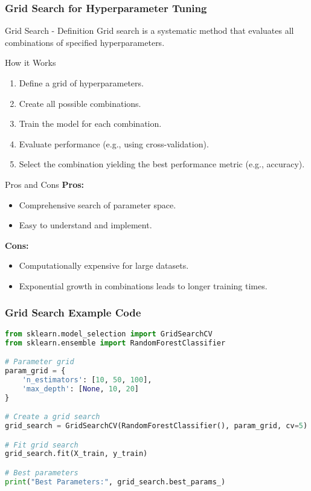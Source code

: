 \documentclass[aspectratio=169]{beamer}
\begin{document}
\begin{frame}[fragile]
    \frametitle{Grid Search for Hyperparameter Tuning}
    \begin{block}{Grid Search - Definition}
        Grid search is a systematic method that evaluates all combinations of specified hyperparameters.
    \end{block}
    
    \begin{block}{How it Works}
        \begin{enumerate}
            \item Define a grid of hyperparameters.
            \item Create all possible combinations.
            \item Train the model for each combination.
            \item Evaluate performance (e.g., using cross-validation).
            \item Select the combination yielding the best performance metric (e.g., accuracy).
        \end{enumerate}
    \end{block}
    
    \begin{block}{Pros and Cons}
        \textbf{Pros:}
        \begin{itemize}
            \item Comprehensive search of parameter space.
            \item Easy to understand and implement.
        \end{itemize}
        \textbf{Cons:}
        \begin{itemize}
            \item Computationally expensive for large datasets.
            \item Exponential growth in combinations leads to longer training times.
        \end{itemize}
    \end{block}
\end{frame}

\begin{frame}[fragile]
    \frametitle{Grid Search Example Code}
    \begin{lstlisting}[language=Python]
from sklearn.model_selection import GridSearchCV
from sklearn.ensemble import RandomForestClassifier

# Parameter grid
param_grid = {
    'n_estimators': [10, 50, 100],
    'max_depth': [None, 10, 20]
}

# Create a grid search
grid_search = GridSearchCV(RandomForestClassifier(), param_grid, cv=5)

# Fit grid search
grid_search.fit(X_train, y_train)

# Best parameters
print("Best Parameters:", grid_search.best_params_)
    \end{lstlisting}
\end{frame}
\end{document}
